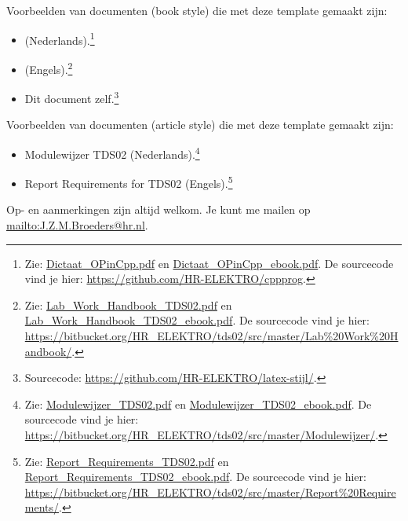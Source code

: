 Voorbeelden van documenten (book style) die met deze template gemaakt zijn:
\begin{itemize}
\item {} \cite{Broeders2019} (Nederlands).\footnote{Zie: \href{https://github.com/HR-ELEKTRO/cppprog/wiki/Dictaat_OPinCpp.pdf}{Dictaat\_OPinCpp.pdf} en
\href{https://github.com/HR-ELEKTRO/cppprog/wiki/Dictaat_OPinCpp_ebook.pdf}{Dictaat\_OPinCpp\_ebook.pdf}.
De sourcecode vind je hier: \url{https://github.com/HR-ELEKTRO/cppprog}.}
\item {} \cite{tds02} (Engels).\footnote{Zie: \href{https://github.com/Harry-Broeders/tds02/wiki/Lab_Work_Handbook/Lab_Work_Handbook_TDS02.pdf}{Lab\_Work\_Handbook\_TDS02.pdf} en
\href{https://github.com/Harry-Broeders/tds02/wiki/Lab_Work_Handbook/Lab_Work_Handbook_TDS02_ebook.pdf}{Lab\_Work\_Handbook\_TDS02\_ebook.pdf}.
De sourcecode vind je hier: \url{https://bitbucket.org/HR_ELEKTRO/tds02/src/master/Lab\%20Work\%20Handbook/}.}
\item Dit document zelf.\footnote{Sourcecode: \url{https://github.com/HR-ELEKTRO/latex-stijl/}.}
\end{itemize} 

Voorbeelden van documenten (article style) die met deze template gemaakt zijn:
\begin{itemize}
\item Modulewijzer TDS02 (Nederlands).\footnote{Zie: \href{https://github.com/Harry-Broeders/tds02/wiki/Modulewijzer/Modulewijzer_TDS02.pdf}{Modulewijzer\_TDS02.pdf} en 
\href{https://github.com/Harry-Broeders/tds02/wiki/Modulewijzer/Modulewijzer_TDS02_ebook.pdf}{Modulewijzer\_TDS02\_ebook.pdf}.
De sourcecode vind je hier: \url{https://bitbucket.org/HR_ELEKTRO/tds02/src/master/Modulewijzer/}.}
\item Report Requirements for TDS02 (Engels).\footnote{Zie: \href{https://github.com/Harry-Broeders/tds02/wiki/Report_Requirements/Report_Requirements_TDS02.pdf}{Report\_Requirements\_TDS02.pdf}
en \href{https://github.com/Harry-Broeders/tds02/wiki/Report_Requirements/Report_Requirements_TDS02_ebook.pdf}{Report\_Requirements\_TDS02\_ebook.pdf}.
De sourcecode vind je hier: \url{https://bitbucket.org/HR_ELEKTRO/tds02/src/master/Report\%20Requirements/}.}
\end{itemize} 

Op- en aanmerkingen zijn altijd welkom.
Je kunt me mailen op \url{mailto:J.Z.M.Broeders@hr.nl}.
